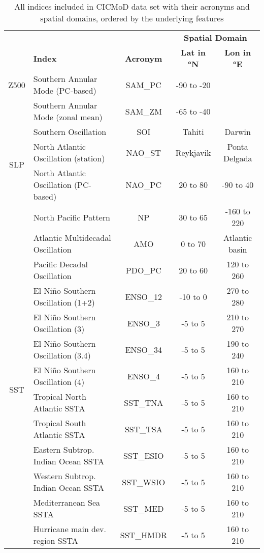 \documentclass{CUP-JNL-DTM}%
\theoremstyle{definition}
\numberwithin{equation}{section}
\begin{document}
\begin{table}
\caption{All indices included in CICMoD data set with their acronyms and spatial domains, ordered by the underlying features} \label{tab:CICMoD}

\begin{center}
\begin{tabular}{|c|l|c|cc|}
\hline
 & & & \multicolumn{2}{c|}{\textbf{Spatial Domain}}\\
 & \textbf{Index} & \textbf{Acronym} & \textbf{Lat in °N} & \textbf{Lon in °E} \\
\hline
Z500 & Southern Annular Mode (PC-based) & SAM\_PC & -90 to -20 & \\
\hline
\multirow{5}{*}{SLP} & Southern Annular Mode (zonal mean) & SAM\_ZM & -65 to -40 & \\
 & Southern Oscillation & SOI & Tahiti & Darwin\\
 & North Atlantic Oscillation (station) & NAO\_ST & Reykjavik & Ponta Delgada\\
 & North Atlantic Oscillation (PC-based) & NAO\_PC & 20 to 80 & -90 to 40\\
 & North Pacific Pattern & NP & 30 to 65 & -160 to 220\\
\hline
\multirow{12}{*}{SST} & Atlantic Multidecadal Oscillation & AMO & 0 to 70 & Atlantic basin\\
 & Pacific Decadal Oscillation & PDO\_PC & 20 to 60 & 120 to 260\\
 & El Ni\~{n}o Southern Oscillation (1+2) & ENSO\_12 & -10 to 0 & 270 to 280\\
 & El Ni\~{n}o Southern Oscillation (3) & ENSO\_3 & -5 to 5 & 210 to 270\\
 & El Ni\~{n}o Southern Oscillation (3.4) & ENSO\_34 & -5 to 5 & 190 to 240\\
 & El Ni\~{n}o Southern Oscillation (4) & ENSO\_4 & -5 to 5 & 160 to 210\\
 & Tropical North Atlantic SSTA & SST\_TNA & -5 to 5 & 160 to 210\\
 & Tropical South Atlantic SSTA & SST\_TSA & -5 to 5 & 160 to 210\\
 & Eastern Subtrop. Indian Ocean SSTA & SST\_ESIO & -5 to 5 & 160 to 210\\
 & Western Subtrop. Indian Ocean SSTA & SST\_WSIO & -5 to 5 & 160 to 210\\
 & Mediterranean Sea SSTA & SST\_MED & -5 to 5 & 160 to 210\\
 & Hurricane main dev. region SSTA & SST\_HMDR & -5 to 5 & 160 to 210\\

\end{tabular}
\end{center}
\end{table}
\end{document}
